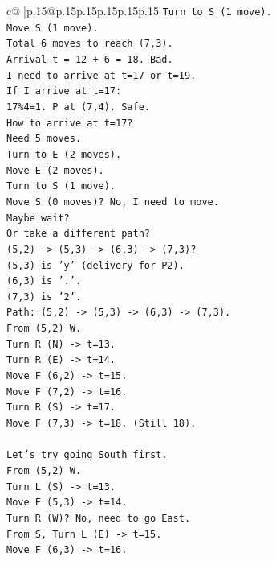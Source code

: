 \documentclass{article}
\begin{document}
{\begin{supertabular}{c@{$\;$}|p{.15\linewidth}@{}p{.15\linewidth}p{.15\linewidth}p{.15\linewidth}p{.15\linewidth}p{.15\linewidth}}
{{{\texttt{Turn to S (1 move).} \\
\texttt{Move S (1 move).} \\
\texttt{Total 6 moves to reach (7,3).} \\
\texttt{Arrival t = 12 + 6 = 18. Bad.} \\
\texttt{I need to arrive at t=17 or t=19.} \\
\texttt{If I arrive at t=17:} \\
\texttt{17\%4=1. P at (7,4). Safe.} \\
\texttt{How to arrive at t=17?} \\
\texttt{Need 5 moves.} \\
\texttt{Turn to E (2 moves).} \\
\texttt{Move E (2 moves).} \\
\texttt{Turn to S (1 move).} \\
\texttt{Move S (0 moves)? No, I need to move.} \\
\texttt{Maybe wait?} \\
\texttt{Or take a different path?} \\
\texttt{(5,2) {-}> (5,3) {-}> (6,3) {-}> (7,3)?} \\
\texttt{(5,3) is 'y' (delivery for P2).} \\
\texttt{(6,3) is '.'.} \\
\texttt{(7,3) is '2'.} \\
\texttt{Path: (5,2) {-}> (5,3) {-}> (6,3) {-}> (7,3).} \\
\texttt{From (5,2) W.} \\
\texttt{Turn R (N) {-}> t=13.} \\
\texttt{Turn R (E) {-}> t=14.} \\
\texttt{Move F (6,2) {-}> t=15.} \\
\texttt{Move F (7,2) {-}> t=16.} \\
\texttt{Turn R (S) {-}> t=17.} \\
\texttt{Move F (7,3) {-}> t=18. (Still 18).} \\
\\ 
\texttt{Let's try going South first.} \\
\texttt{From (5,2) W.} \\
\texttt{Turn L (S) {-}> t=13.} \\
\texttt{Move F (5,3) {-}> t=14.} \\
\texttt{Turn R (W)? No, need to go East.} \\
\texttt{From S, Turn L (E) {-}> t=15.} \\
\texttt{Move F (6,3) {-}> t=16.} \\
}}}
\end{supertabular}}
\end{document}
